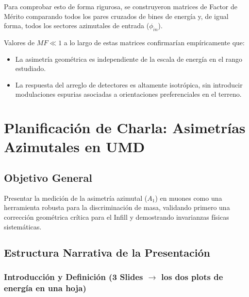 Para comprobar esto de forma rigurosa, se construyeron matrices de Factor de Mérito comparando todos los pares cruzados de bines de energía y, de igual forma, todos los sectores azimutales de entrada ($\phi_{in}$). 

Valores de $MF \ll 1$ a lo largo de estas matrices confirmarían empíricamente que:
\begin{itemize}
	\item La asimetría geométrica es independiente de la escala de energía en el rango estudiado.
	\item La respuesta del arreglo de detectores es altamente isotrópica, sin introducir modulaciones espurias asociadas a orientaciones preferenciales en el terreno.
\end{itemize}


\section{Planificación de Charla: Asimetrías Azimutales en UMD}

\subsection{Objetivo General}
Presentar la medición de la asimetría azimutal ($A_1$) en muones como una herramienta robusta para la discriminación de masa, validando primero una corrección geométrica crítica para el Infill y demostrando invarianzas físicas sistemáticas.

\subsection{Estructura Narrativa de la Presentación}

\subsubsection{Introducción y Definición (3 Slides $\rightarrow$ los dos plots de energía en una hoja)}

